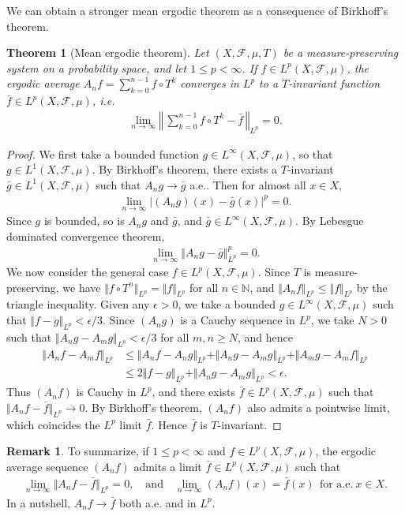 \documentclass{article}
\numberwithin{equation}{section}
\newcommand{\bbN}{\mathbb{N}}
\newcommand{\scr}{\mathscr}
\theoremstyle{plain}
\newtheorem{theorem}{Theorem}[section]
\theoremstyle{definition}
\newtheorem*{remark}{Remark}
\begin{document}
We can obtain a stronger mean ergodic theorem as a consequence of Birkhoff's theorem.
\begin{theorem}[Mean ergodic theorem]\label{meanerglp}
Let $(X,\scr{F},\mu,T)$ be a measure-preserving system on a probability space, and let $1\leq p<\infty$. If $f\in L^p(X,\scr{F},\mu)$, the ergodic average $A_nf=\sum_{k=0}^{n-1}f\circ T^k$ converges in $L^p$ to a $T$-invariant function $\bar{f}\in L^p(X,\scr{F},\mu)$, i.e.
\begin{align*}
	\lim_{n\to\infty}\left\Vert\,\sum_{k=0}^{n-1}f\circ T^k-\bar{f}\,\right\Vert_{L^p} = 0.
\end{align*}
\end{theorem}
\begin{proof}
We first take a bounded function $g\in L^\infty(X,\scr{F},\mu)$, so that $g\in L^1(X,\scr{F},\mu)$. By Birkhoff's theorem, there exists a $T$-invariant $\bar{g}\in L^1(X,\scr{F},\mu)$ such that $A_ng\to\bar{g}$ a.e.. Then for almost all $x\in X$,
\begin{align*}
	\lim_{n\to\infty}\left\vert (A_ng)(x)-\bar{g}(x)\right\vert^p=0.
\end{align*}
Since $g$ is bounded, so is $A_ng$ and $\bar{g}$, and $\bar{g}\in L^\infty(X,\scr{F},\mu)$. By Lebesgue dominated convergence theorem, 
\begin{align*}
	\lim_{n\to\infty}\left\Vert A_ng-\bar{g}\right\Vert_{L^p}^p=0.
\end{align*}
We now consider the general case $f\in L^p(X,\scr{F},\mu)$. Since $T$ is measure-preserving, we have $\Vert f\circ T^n\Vert_{L^p}=\Vert f\Vert_{L^p}$ for all $n\in\bbN$, and $\Vert A_nf\Vert_{L^p}\leq\Vert f\Vert_{L^p}$ by the triangle inequality. Given any $\epsilon>0$, we take a bounded $g\in L^\infty(X,\scr{F},\mu)$ such that $\Vert f-g\Vert_{L^p}<\epsilon/3$. Since $(A_ng)$ is a Cauchy sequence in $L^p$, we take $N>0$ such that $\Vert A_ng-A_mg\Vert_{L^p}<\epsilon/3$ for all $m,n\geq N$, and hence
\begin{align*}
	\Vert A_nf-A_mf\Vert_{L^p}&\leq\Vert A_nf-A_ng\Vert_{L^p}+\Vert A_ng-A_mg\Vert_{L^p} + \Vert A_mg-A_mf\Vert_{L^p}\\
	&\leq 2\Vert f-g\Vert_{L^p}+\Vert A_ng-A_mg\Vert_{L^p}<\epsilon.
\end{align*}
Thus $(A_nf)$ is Cauchy in $L^p$, and there exists $\bar{f}\in L^p(X,\scr{F},\mu)$ such that $\Vert A_nf-\bar{f}\Vert_{L^p}\to 0$. By Birkhoff's theorem, $(A_nf)$ also admits a pointwise limit, which coincides the $L^p$ limit $\bar{f}$. Hence $\bar{f}$ is $T$-invariant.
\end{proof}
\begin{remark}
To summarize, if $1\leq p<\infty$ and $f\in L^p(X,\scr{F},\mu)$, the ergodic average sequence $(A_nf)$ admits a limit $\bar{f}\in L^p(X,\scr{F},\mu)$ such that
\begin{align*}
	\lim_{n\to\infty}\Vert A_nf-\bar{f}\Vert_{L^p}=0,\quad\text{and}\quad \lim_{n\to\infty}(A_nf)(x)=\bar{f}(x)\ \ \text{for a.e.}\ x\in X.
\end{align*} In a nutshell, $A_nf\to\bar{f}$ both a.e. and in $L^p$.
\end{remark}
\end{document}
